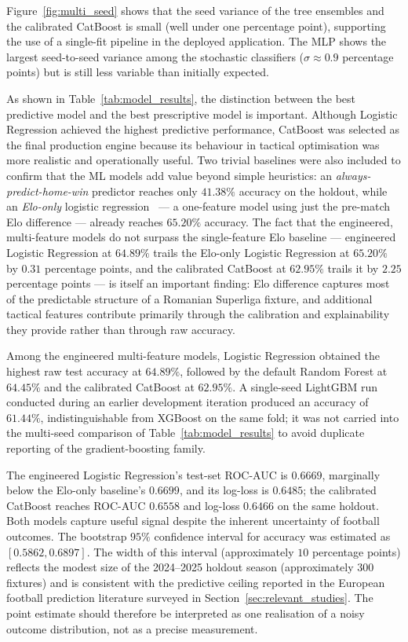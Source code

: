 \FloatBarrier

Figure~\ref{fig:multi_seed} shows that the seed variance of the tree ensembles and the calibrated CatBoost is small (well under one percentage point), supporting the use of a single-fit pipeline in the deployed application. The MLP shows the largest seed-to-seed variance among the stochastic classifiers ($\sigma \approx 0.9$ percentage points) but is still less variable than initially expected.

As shown in Table~\ref{tab:model_results}, the distinction between the best predictive model and the best prescriptive model is important. Although Logistic Regression achieved the highest predictive performance, CatBoost was selected as the final production engine because its behaviour in tactical optimisation was more realistic and operationally useful. Two trivial baselines were also included to confirm that the ML models add value beyond simple heuristics: an \emph{always-predict-home-win} predictor reaches only $41.38\%$ accuracy on the holdout, while an \emph{Elo-only} logistic regression~\cite{hvattum2010elo} --- a one-feature model using just the pre-match Elo difference --- already reaches $65.20\%$ accuracy. The fact that the engineered, multi-feature models do not surpass the single-feature Elo baseline --- engineered Logistic Regression at $64.89\%$ trails the Elo-only Logistic Regression at $65.20\%$ by $0.31$ percentage points, and the calibrated CatBoost at $62.95\%$ trails it by $2.25$ percentage points --- is itself an important finding: Elo difference captures most of the predictable structure of a Romanian Superliga fixture, and additional tactical features contribute primarily through the calibration and explainability they provide rather than through raw accuracy.

Among the engineered multi-feature models, Logistic Regression obtained the highest raw test accuracy at $64.89\%$, followed by the default Random Forest at $64.45\%$ and the calibrated CatBoost at $62.95\%$. A single-seed LightGBM run conducted during an earlier development iteration produced an accuracy of $61.44\%$, indistinguishable from XGBoost on the same fold; it was not carried into the multi-seed comparison of Table~\ref{tab:model_results} to avoid duplicate reporting of the gradient-boosting family.

The engineered Logistic Regression's test-set ROC-AUC is $0.6669$, marginally below the Elo-only baseline's $0.6699$, and its log-loss is $0.6485$; the calibrated CatBoost reaches ROC-AUC $0.6558$ and log-loss $0.6466$ on the same holdout. Both models capture useful signal despite the inherent uncertainty of football outcomes. The bootstrap $95\%$ confidence interval for accuracy was estimated as $[0.5862, 0.6897]$. The width of this interval (approximately $10$ percentage points) reflects the modest size of the 2024--2025 holdout season (approximately $300$ fixtures) and is consistent with the predictive ceiling reported in the European football prediction literature surveyed in Section~\ref{sec:relevant_studies}. The point estimate should therefore be interpreted as one realisation of a noisy outcome distribution, not as a precise measurement.

